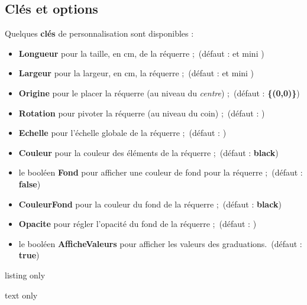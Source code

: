 \documentclass[french,a4paper,11pt]{article}
\newcommand\Cle[1]{{\bfseries\sffamily\textlangle #1\textrangle}}
\newcommand\affichegrille[4]{%
	\draw[xstep=1,ystep=1,lightgray] (#1,#3) grid (#2,#4) ;
	\foreach \x in {#1,\inteval{1+#1},...,#2} \draw[lightgray] (\x,#4)--++(0,3pt) node[font=\scriptsize,above] {$\x$} ;
	\foreach \y in {#3,\inteval{1+#3},...,#4} \draw[lightgray] (#1,\y)--++(-3pt,0) node[font=\scriptsize,left] {$\y$} ;
}
\newcommand\pointsutiles[1]{%
	\foreach \point in {#1} {\draw[thick,fill=red] \point circle[radius=3pt] ;}
}
\begin{document}
\subsection{Clés et options}

\begin{tipblock}
Quelques \Cle{clés} de personnalisation sont disponibles :

\begin{itemize}
	\item \Cle{Longueur} pour la taille, en cm, de la réquerre ;\hfill~(défaut : \Cle{12} et mini \Cle{6})
	\item \Cle{Largeur} pour la largeur, en cm, la réquerre ;\hfill~(défaut : \Cle{3} et mini \Cle{1.5})
	\item \Cle{Origine} pour le placer la réquerre (au niveau du \textit{centre}) ;\hfill~(défaut : \Cle{\{(0,0)\}})
	\item \Cle{Rotation} pour pivoter la réquerre (au niveau du coin) ;\hfill~(défaut : \Cle{0})
	\item \Cle{Echelle} pour l'échelle globale de la réquerre ;\hfill~(défaut : \Cle{1})
	\item \Cle{Couleur} pour la couleur des éléments de la réquerre ;\hfill~(défaut : \Cle{black})
	\item le booléen \Cle{Fond} pour afficher une couleur de fond pour la réquerre ;\hfill~(défaut : \Cle{false})
	\item \Cle{CouleurFond} pour la couleur du fond de la réquerre ;\hfill~(défaut : \Cle{black})
	\item \Cle{Opacite} pour régler l'opacité du fond de la réquerre ;\hfill~(défaut : \Cle{0.5})
	\item le booléen \Cle{AfficheValeurs} pour afficher les valeurs des graduations.\hfill~(défaut : \Cle{true})
\end{itemize}
\vspace*{-\baselineskip}\leavevmode
\end{tipblock}

\begin{PresentationCode}{listing only}
\tkzRequerre[Fond,CouleurFond=yellow]
\tkzRequerre[Echelle=0.5,Origine={(-5,-6)},Rotation=-80,Couleur=ForestGreen, Longueur=10,Largeur=3.5,AfficheValeurs=false]
\tkzRequerre[Origine={(1,-5)},Rotation=15,Couleur=DarkBlue, Longueur=9,Largeur=2.75]
\end{PresentationCode}

\begin{PresentationCode}{text only}
\end{PresentationCode}
\end{document}
